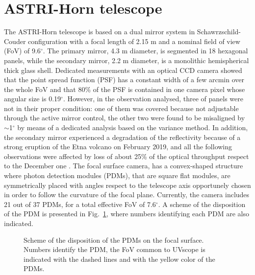 \section{ASTRI-Horn telescope} 
The ASTRI-Horn telescope is based on a dual mirror system in Schawrzschild-Couder configuration with a focal length of 2.15 m and a nominal field of view (FoV) of 9.6$^\circ$. 
The primary mirror, 4.3 m diameter, is segmented in 18 hexagonal panels, while the secondary mirror, 2.2 m diameter, is a monolithic hemispherical thick glass shell. 
Dedicated measurements  with an optical CCD camera showed that the point spread function (PSF) has a constant width of a few arcmin
over the whole FoV and that  80\% of the PSF  is contained in one camera pixel \citep{Giro2017}
whose angular size is 0.19$^\circ$. 
However, in the observation analysed, three of panels were not in their proper condition:
one of them was covered because not adjustable through the active mirror control, the other two were found to be misaligned by $\sim$1$^\circ$ by means of a dedicated analysis based on the variance method.
In addition, the secondary mirror experienced a degradation of the reflectivity because of a strong eruption of the Etna volcano on February 2019, and all the following observations were affected by loss of about 25\% of the optical throughput
respect to the December one \citep{Mineo2019}. 
The focal surface camera, has a convex-shaped structure where photon detection modules (PDMs), that are square flat modules, are symmetrically placed with angles respect to the telescope axis opportunely chosen in order to follow the curvature of the focal plane.
Currently, the camera includes 21 out of 37 PDMs, for a total effective FoV of 7.6$^\circ$.
A scheme of the disposition of the PDM is presented in Fig.~\ref{fig:camera}, where numbers identifying each PDM are also indicated. 
\begin{figure}
\caption{Scheme of the disposition of the PDMs on the focal surface. Numbers identify the PDM, the FoV common to UVscope is indicated with the dashed lines and with the yellow color of the PDMs.}
\label{fig:camera}
\end{figure}

